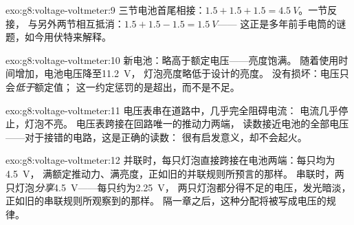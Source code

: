 \begin{solution}{exo:g8:voltage-voltmeter:9}
三节电池首尾相接：$1.5 + 1.5 + 1.5 = \qty{4.5}{V}$。一节反接，
与另外两节相互抵消：$1.5 + 1.5 - 1.5 = \qty{1.5}{V}$——
这正是多年前手电筒的谜题，如今用伏特来解释。
\end{solution}

\begin{solution}{exo:g8:voltage-voltmeter:10}
新电池：略高于额定电压——亮度饱满。
随着使用时间增加，电池电压降至\qty{11.2}{V}，
灯泡亮度略低于设计的亮度。
没有损坏：电压只会\emph{低于}额定值；
这一约定惩罚的是超出，而不是不足。
\end{solution}

\begin{solution}{exo:g8:voltage-voltmeter:11}
电压表串在道路中，几乎完全阻碍电流：
电流几乎停止，灯泡不亮。
电压表跨接在回路唯一的推动力两端，
读数接近电池的全部电压——对于接错的电路，这是正确的读数：
很有启发意义，却不会起火。
\end{solution}

\begin{solution}{exo:g8:voltage-voltmeter:12}
并联时，每只灯泡直接跨接在电池两端：每只均为\qty{4.5}{V}，
满额定推动力、满亮度，正如旧的并联规则所预言的那样。
串联时，两只灯泡\emph{分享}\qty{4.5}{V}——每只约为\qty{2.25}{V}，
两只灯泡都分得不足的电压，发光暗淡，
正如旧的串联规则所观察到的那样。
隔一章之后，这种分配将被写成电压的规律。
\end{solution}

